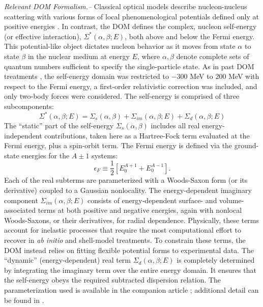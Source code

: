 \documentclass[twocolumn,secnumarabic,amssymb, nobibnotes, aps, prl, superscriptaddress, nobalancelastpage]{revtex4-1}
\begin{document}
\textit{Relevant DOM Formalism.--}
Classical optical models describe nucleon-nucleus scattering with various forms of local phenomenological
potentials defined only at positive energies \cite{BecchettiGreenlees, CH89, KoningDelaroche}. In
contrast, the DOM defines the complex, nucleon self-energy (or effective interaction), $\Sigma^{*}(\alpha,\beta;E)$, both above and below the
Fermi energy. This potential-like object dictates
 nucleon behavior as it moves from state $\alpha$ to state $\beta$ in the nuclear
medium at energy $E$, where $\alpha,\beta$ denote complete sets of
quantum numbers sufficient to specify the single-particle state.
As in past DOM treatments \cite{Mahzoon2014, Atkinson2018, Atkinson2019,
Atkinson2020}, the self-energy domain was restricted
to $-300$ MeV to $200$ MeV with respect to the Fermi energy, a first-order
relativistic correction was included, and only two-body forces were considered.
The self-energy is comprised of three subcomponents:
\begin{equation} \label{SelfEnergyBreakdown}
        \Sigma^{*}(\alpha,\beta;E) = \Sigma_{s}(\alpha,\beta) + \Sigma_{im}(\alpha,\beta;E)
        + \Sigma_{d}(\alpha,\beta;E)
\end{equation}
The ``static'' part of the self-energy $\Sigma_{s}(\alpha,\beta)$ includes all
real energy-independent contributions, taken here as a Hartree-Fock term
evaluated at the Fermi energy, plus a spin-orbit term. The Fermi energy is defined via the
ground-state energies for the $A\pm1$ systems:
\begin{equation} \label{FermiEnergyDefinition}
    \epsilon_{F} \equiv \frac{1}{2}[E^{A+1}_{0}+E^{A-1}_{0}].
\end{equation}
Each of the real subterms are parameterized with a Woods-Saxon form (or its derivative) coupled
to a Gaussian nonlocality. The energy-dependent imaginary component
$\Sigma_{im}(\alpha,\beta;E)$ consists of energy-dependent surface- and volume-associated
terms at both positive and negative energies, again with nonlocal Woods-Saxons,
or their derivatives, for radial dependence. Physically, these terms account for
inelastic processes that require the most computational effort to recover
in \textit{ab initio} and shell-model treatments.
To constrain these terms, the DOM instead relies on fitting flexible potential forms to
experimental data. The ``dynamic'' (energy-dependent) real term $\Sigma_{d}(\alpha,\beta;E)$ is
completely determined by integrating the imaginary term over the entire energy
domain. It ensures that the self-energy obeys the required subtracted dispersion relation.
The parameterization used is available in the companion article
\cite{Pruitt2020PRC}; additional detail can be found in \cite{PruittPhDThesis}.
\end{document}

